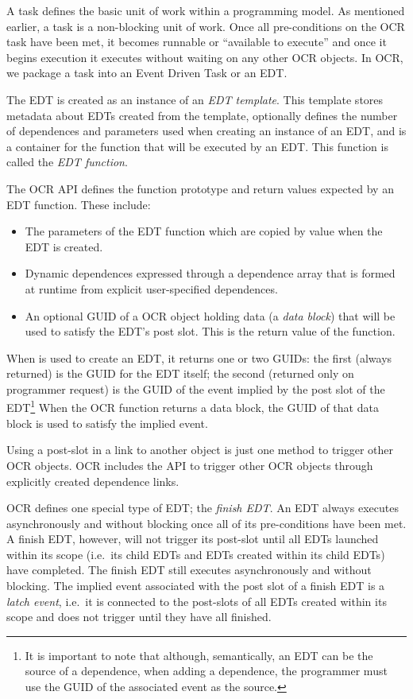 A task defines the basic unit of work within a programming model. As
mentioned earlier, a task is a non-blocking unit of work. Once all
pre-conditions on the OCR task have been met, it becomes
runnable or ``available to execute'' and once it
begins execution it executes without waiting on any other OCR
objects. In OCR, we package a task into an Event Driven
Task or an EDT.

The EDT is created as an instance of an \emph{EDT template}. This template stores metadata about EDTs created from the
template, optionally defines the number of dependences and parameters
used when creating an instance of an EDT, and is a container for the
function that will be executed by an EDT. This function is called the
\emph{EDT function}.

The OCR API defines the function prototype and return values expected
by an EDT function. These include:
\begin{itemize}
\item The parameters of the EDT function which are copied by value
when the EDT is created.
\item Dynamic dependences expressed through a dependence array that is
formed at runtime from explicit user-specified dependences.
\item An optional GUID of a OCR object holding data (a \emph{data
block}) that will be used to satisfy the EDT’s post slot. This is the
return value of the function.
\end{itemize}
When  is used to create an EDT, it returns one or
two GUIDs: the first (always returned) is the GUID for the EDT itself;
the second (returned only on programmer request) is the GUID of the
event implied by the post slot of the EDT\footnote{It is important to
  note that although, semantically, an EDT can be the source of a
  dependence, when adding a dependence, the programmer must use the
  GUID of the associated event as the source.}
When the OCR function returns a data block, the GUID of
that data block is used to satisfy the implied event.

Using a post-slot in a link to another object is just one method to
trigger other OCR objects. OCR includes the 
API to trigger other OCR objects through explicitly created dependence
links.

OCR defines one special type of EDT; the \emph{finish
EDT}. An EDT always executes asynchronously and
without blocking once all of its pre-conditions have been met. A
finish EDT, however, will not trigger its post-slot until all EDTs
launched within its scope (i.e.\ its child EDTs and EDTs created
within its child EDTs) have completed.  The finish EDT still executes
asynchronously and without blocking. The implied event associated with
the post slot of a finish EDT is a \emph{latch event}, i.e.\ it is
connected to the post-slots of all EDTs created within its scope and
does not trigger until they have all finished.

